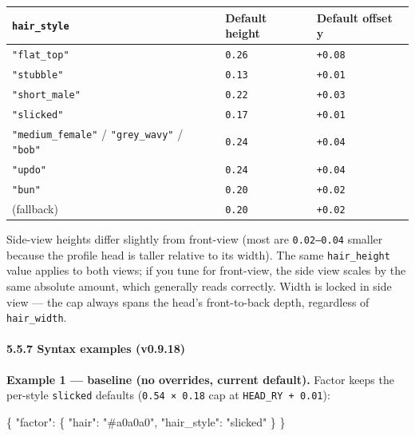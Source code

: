 \documentclass[
  12pt,
  letterpaper,
]{book}
\newenvironment{Shaded}{}{}
\newcommand{\DataTypeTok}[1]{\textcolor[rgb]{0.56,0.13,0.00}{#1}}
\newcommand{\FunctionTok}[1]{\textcolor[rgb]{0.02,0.16,0.49}{#1}}
\newcommand{\StringTok}[1]{\textcolor[rgb]{0.25,0.44,0.63}{#1}}
\begin{document}
\begin{longtable}[]{@{}
  >{\raggedright\arraybackslash}p{}
  >{\raggedright\arraybackslash}p{}
  >{\raggedright\arraybackslash}p{}@{}}
\toprule\noalign{}
\texttt{hair\_style} & Default height & Default offset y \\
\midrule\noalign{}
\endhead
\bottomrule\noalign{}
\endlastfoot
\texttt{"flat\_top"} & \texttt{0.26} & \texttt{+0.08} \\
\texttt{"stubble"} & \texttt{0.13} & \texttt{+0.01} \\
\texttt{"short\_male"} & \texttt{0.22} & \texttt{+0.03} \\
\texttt{"slicked"} & \texttt{0.17} & \texttt{+0.01} \\
\texttt{"medium\_female"} / \texttt{"grey\_wavy"} / \texttt{"bob"} &
\texttt{0.24} & \texttt{+0.04} \\
\texttt{"updo"} & \texttt{0.24} & \texttt{+0.04} \\
\texttt{"bun"} & \texttt{0.20} & \texttt{+0.02} \\
(fallback) & \texttt{0.20} & \texttt{+0.02} \\
\end{longtable}

Side-view heights differ slightly from front-view (most are
\texttt{0.02--0.04} smaller because the profile head is taller relative
to its width). The same \texttt{hair\_height} value applies to both
views; if you tune for front-view, the side view scales by the same
absolute amount, which generally reads correctly. Width is locked in
side view --- the cap always spans the head's front-to-back depth,
regardless of \texttt{hair\_width}.

\paragraph{\texorpdfstring{5.5.7 Syntax examples
(v0.9.18)}{5.5.7 Syntax examples (v0.9.18)}}\label{hair-geometry-examples}

\textbf{Example 1 --- baseline (no overrides, current default).} Factor
keeps the per-style \texttt{slicked} defaults (\texttt{0.54\ ×\ 0.18}
cap at \texttt{HEAD\_RY\ +\ 0.01}):

\begin{Shaded}
\begin{Highlighting}[]
\FunctionTok{\{}
  \DataTypeTok{"factor"}\FunctionTok{:} \FunctionTok{\{}
    \DataTypeTok{"hair"}\FunctionTok{:}       \StringTok{"\#a0a0a0"}\FunctionTok{,}
    \DataTypeTok{"hair\_style"}\FunctionTok{:} \StringTok{"slicked"}
  \FunctionTok{\}}
\FunctionTok{\}}
\end{Highlighting}
\end{Shaded}
\end{document}
